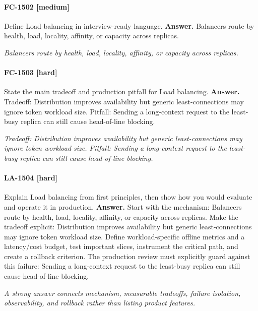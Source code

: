 \paragraph{FC-1502 [medium]} Define Load balancing in interview-ready language.
\noindent\textbf{Answer.} Balancers route by health, load, locality, affinity, or capacity across replicas.
\par\textit{Balancers route by health, load, locality, affinity, or capacity across replicas.}
\paragraph{FC-1503 [hard]} State the main tradeoff and production pitfall for Load balancing.
\noindent\textbf{Answer.} Tradeoff: Distribution improves availability but generic least-connections may ignore token workload size. Pitfall: Sending a long-context request to the least-busy replica can still cause head-of-line blocking.
\par\textit{Tradeoff: Distribution improves availability but generic least-connections may ignore token workload size. Pitfall: Sending a long-context request to the least-busy replica can still cause head-of-line blocking.}
\paragraph{LA-1504 [hard]} Explain Load balancing from first principles, then show how you would evaluate and operate it in production.
\noindent\textbf{Answer.} Start with the mechanism: Balancers route by health, load, locality, affinity, or capacity across replicas. Make the tradeoff explicit: Distribution improves availability but generic least-connections may ignore token workload size. Define workload-specific offline metrics and a latency/cost budget, test important slices, instrument the critical path, and create a rollback criterion. The production review must explicitly guard against this failure: Sending a long-context request to the least-busy replica can still cause head-of-line blocking.
\par\textit{A strong answer connects mechanism, measurable tradeoffs, failure isolation, observability, and rollback rather than listing product features.}
